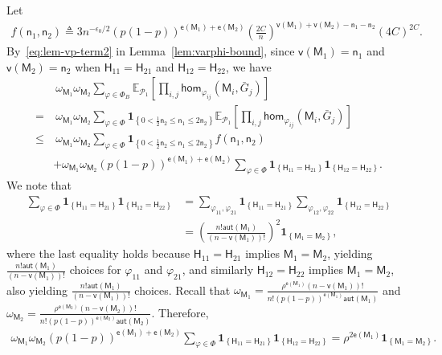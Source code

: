 \documentclass[letterpaper,11pt]{article}
\theoremstyle{definition}
\newcommand{\maP}{\mathcal{P}}
\newcommand{\en}{\mathsf{{e}}}
\newcommand{\vn}{\mathsf{{v}}}
\newcommand{\pth}[1]{\left( #1 \right)}
\newcommand{\qth}[1]{\left[ #1 \right]}
\newcommand{\sfH}{{\mathsf{H}}}
\newcommand{\sfM}{{\mathsf{M}}}
\newcommand{\sfn}{{\mathsf{n}}}
\newcommand{\indc}[1]{{\mathbf{1}_{\left\{{#1}\right\}}}}
\newcommand{\aut}{\mathsf{aut}}
\renewcommand{\hom}{\mathsf{hom}}
\newcommand{\vp}{\varphi}
\def\E{\mathbb{E}}
\begin{document}
Let  \begin{align*}
    f(\sfn_1,\sfn_2)\triangleq 3n^{-\epsilon_0/2}(p(1-p))^{\en(\sfM_1)+\en(\sfM_2)} \pth{\frac{2C}{n}}^{\vn(\sfM_1)+\vn(\sfM_2)-\sfn_1-\sfn_2} \pth{4C}^{2C}.
\end{align*}
By~\eqref{eq:lem-vp-term2} in  Lemma~\ref{lem:varphi-bound}, since $\vn(\sfM_1) = \sfn_1$ and $\vn(\sfM_2) = \sfn_2$ when $\sfH_{11} = \sfH_{21}$ and $\sfH_{12} = \sfH_{22}$, we have \begin{align}
    \nonumber &~\omega_{\sfM_1}\omega_{\sfM_2}\sum_{\vp\in \Phi_B}  \E_{\maP_1}\qth{\prod_{i,j}\hom_{\vp_{ij}}(\sfM_i,\bar{G}_j)}\\\nonumber =&~\omega_{\sfM_1}\omega_{\sfM_2}\sum_{\vp\in \Phi} \indc{0<\frac{1}{2}\sfn_2\le \sfn_1\le 2\sfn_2} \E_{\maP_1}\qth{\prod_{i,j}\hom_{\vp_{ij}}(\sfM_i,\bar{G}_j)}\\\label{eq:prop2-sum-1}\le&~\omega_{\sfM_1}\omega_{\sfM_2}  \sum_{\vp\in \Phi} \indc{0<\frac{1}{2}\sfn_2\le \sfn_1\le 2\sfn_2} f(\sfn_1,\sfn_2)\\\label{eq:prop2-sum-2}
    &+\omega_{\sfM_1}\omega_{\sfM_2} (p(1-p))^{\en(\sfM_1)+\en(\sfM_2)} \sum_{\vp\in \Phi} \indc{\sfH_{11} = \sfH_{21}} \indc{\sfH_{12} = \sfH_{22}} .
\end{align}
 We note that \begin{align*}
    \sum_{\vp\in \Phi} \indc{\sfH_{11}= \sfH_{21}}\indc{\sfH_{12} = \sfH_{22}} &= \sum_{\vp_{11},\vp_{21}}\indc{\sfH_{11} = \sfH_{21}} \sum_{\vp_{12},\vp_{22}}  \indc{\sfH_{12} = \sfH_{22}}\\ &= \pth{\frac{n! \aut(\sfM_1)}{(n-\vn(\sfM_1))!}}^2 \indc{\sfM_1=\sfM_2},
\end{align*}
where the last equality holds because $\sfH_{11} = \sfH_{21}$ implies $\sfM_1 = \sfM_2$, yielding $\frac{n!\aut(\sfM_1)}{(n-\vn(\sfM_1))!}$ choices for $\vp_{11}$ and $\vp_{21}$, and similarly $\sfH_{12} = \sfH_{22}$ implies $\sfM_1 = \sfM_2$, also yielding $\frac{n! \aut(\sfM_1)}{(n-\vn(\sfM_1))!}$ choices. 
Recall that $\omega_{\sfM_1}=\frac{\rho^{\en(\sfM_1)} (n-\vn(\sfM_1))!}{n! (p(1-p))^{\en(\sfM_1)}\aut(\sfM_1)}$ and $\omega_{\sfM_2}=\frac{\rho^{\en(\sfM_2)} (n-\vn(\sfM_2))!}{n! (p(1-p))^{\en(\sfM_2)}\aut(\sfM_2)}$.
Therefore,\begin{align}\label{eq:prop2-sum-3}
    \omega_{\sfM_1}\omega_{\sfM_2} (p(1-p))^{\en(\sfM_1)+\en(\sfM_2)} \sum_{\vp\in \Phi} \indc{\sfH_{11} = \sfH_{21}} \indc{\sfH_{12} = \sfH_{22}} = \rho^{2\en(\sfM_1)}\indc{\sfM_1 = \sfM_2}.
\end{align}
\end{document}
